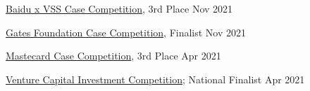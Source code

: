 \href{https://www.facebook.com/events/1218686891977031}{Baidu x VSS Case Competition}, 3rd Place \hfill Nov 2021\par
\href{https://www.facebook.com/events/833366260673950}{Gates Foundation Case Competition}, Finalist \hfill Nov 2021\par
\href{https://www.facebook.com/groups/892224561557976}{Mastecard Case Competition}, 3rd Place \hfill Apr 2021\par
\href{https://www.vcic.org/}{Venture Capital Investment Competition}; National Finalist \hfill Apr 2021\par